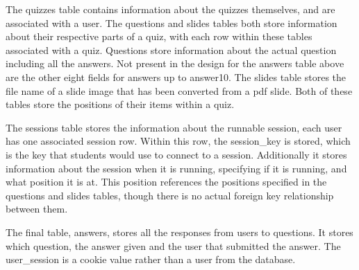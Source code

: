 The quizzes table contains information about the quizzes themselves, and are associated with a user. The questions and slides tables both store information about their respective parts of a quiz, with each row within these tables associated with a quiz. Questions store information about the actual question including all the answers. Not present in the design  for the answers table above are the other eight fields for answers up to answer10. The slides table stores the file name of a slide image that has been converted from a pdf slide. Both of these tables store the positions of their items within a quiz.

The sessions table stores the information about the runnable session, each user has one associated session row. Within this row, the session\_key is stored, which is the key that students would use to connect to a session. Additionally it stores information about the session when it is running, specifying if it is running, and what position it is at. This position references the positions specified in the questions and slides tables, though there is no actual foreign key relationship between them. 

The final table, answers, stores all the responses from users to questions. It stores which question, the answer given and the user that submitted the answer. The user\_session is a cookie value rather than a user from the database.